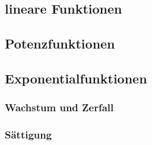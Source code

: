 \setcounter{aufgabenNummer}{1}
  \renewcommand{\kAufgabenBuchstabe}{F}

\subsection{lineare Funktionen}

\subsection{Potenzfunktionen}

\subsection{Exponentialfunktionen}

\subsubsection{Wachstum und Zerfall}

\subsubsection{Sättigung}
